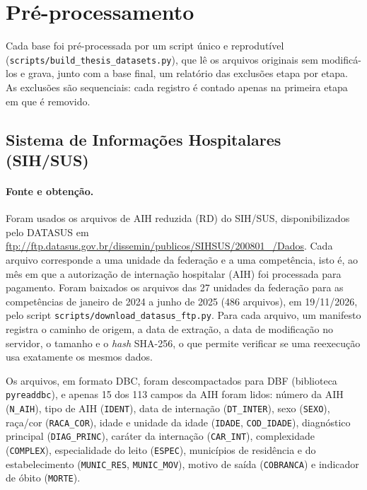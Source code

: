 
\section{Pré-processamento}
\label{sec:preprocessamento}

Cada base foi pré-processada por um script único e reprodutível
(\texttt{scripts/build\_thesis\_datasets.py}), que lê os arquivos originais sem
modificá-los e grava, junto com a base final, um relatório das exclusões etapa
por etapa. As exclusões são sequenciais: cada registro é contado apenas na
primeira etapa em que é removido.

\subsection{Sistema de Informações Hospitalares (SIH/SUS)}
\label{subsec:pre-sih}

\paragraph{Fonte e obtenção.}
Foram usados os arquivos de AIH reduzida (RD) do SIH/SUS, disponibilizados pelo
DATASUS em
\url{ftp://ftp.datasus.gov.br/dissemin/publicos/SIHSUS/200801_/Dados}. Cada
arquivo corresponde a uma unidade da federação e a uma competência, isto é, ao
mês em que a autorização de internação hospitalar (AIH) foi processada para
pagamento. Foram baixados os arquivos das 27 unidades da federação para as
competências de janeiro de 2024 a junho de 2025 (486 arquivos), em 19/11/2026,
pelo script \texttt{scripts/download\_datasus\_ftp.py}. Para cada arquivo, um
manifesto registra o caminho de origem, a data de extração, a data de
modificação no servidor, o tamanho e o \textit{hash} SHA-256, o que permite
verificar se uma reexecução usa exatamente os mesmos dados.

Os arquivos, em formato DBC, foram descompactados para DBF
(biblioteca \texttt{pyreaddbc}), e apenas 15 dos 113 campos da AIH foram lidos:
número da AIH (\texttt{N\_AIH}), tipo de AIH (\texttt{IDENT}), data de internação
(\texttt{DT\_INTER}), sexo (\texttt{SEXO}), raça/cor (\texttt{RACA\_COR}), idade e
unidade da idade (\texttt{IDADE}, \texttt{COD\_IDADE}), diagnóstico principal
(\texttt{DIAG\_PRINC}), caráter da internação (\texttt{CAR\_INT}), complexidade
(\texttt{COMPLEX}), especialidade do leito (\texttt{ESPEC}), municípios de
residência e do estabelecimento (\texttt{MUNIC\_RES}, \texttt{MUNIC\_MOV}), motivo
de saída (\texttt{COBRANCA}) e indicador de óbito (\texttt{MORTE}).


